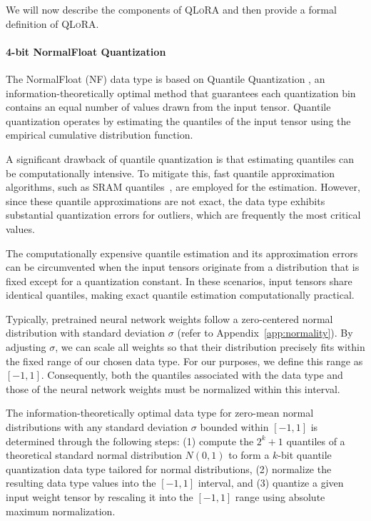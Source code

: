 We will now describe the components of \textsc{QLoRA} and then provide a formal definition of \textsc{QLoRA}.

\paragraph{4-bit NormalFloat Quantization} The NormalFloat (NF) data type is based on Quantile Quantization \citep{dettmers2022optimizers}, an information-theoretically optimal method that guarantees each quantization bin contains an equal number of values drawn from the input tensor. Quantile quantization operates by estimating the quantiles of the input tensor using the empirical cumulative distribution function.

A significant drawback of quantile quantization is that estimating quantiles can be computationally intensive. To mitigate this, fast quantile approximation algorithms, such as SRAM quantiles~\citep{dettmers2022optimizers}, are employed for the estimation. However, since these quantile approximations are not exact, the data type exhibits substantial quantization errors for outliers, which are frequently the most critical values.

The computationally expensive quantile estimation and its approximation errors can be circumvented when the input tensors originate from a distribution that is fixed except for a quantization constant. In these scenarios, input tensors share identical quantiles, making exact quantile estimation computationally practical.

Typically, pretrained neural network weights follow a zero-centered normal distribution with standard deviation $\sigma$ (refer to Appendix~\ref{app:normality}). By adjusting $\sigma$, we can scale all weights so that their distribution precisely fits within the fixed range of our chosen data type. For our purposes, we define this range as $[-1, 1]$. Consequently, both the quantiles associated with the data type and those of the neural network weights must be normalized within this interval.

The information-theoretically optimal data type for zero-mean normal distributions with any standard deviation $\sigma$ bounded within $[-1, 1]$ is determined through the following steps: (1) compute the $2^k+1$ quantiles of a theoretical standard normal distribution $N(0, 1)$ to form a $k$-bit quantile quantization data type tailored for normal distributions, (2) normalize the resulting data type values into the $[-1, 1]$ interval, and (3) quantize a given input weight tensor by rescaling it into the $[-1, 1]$ range using absolute maximum normalization.

